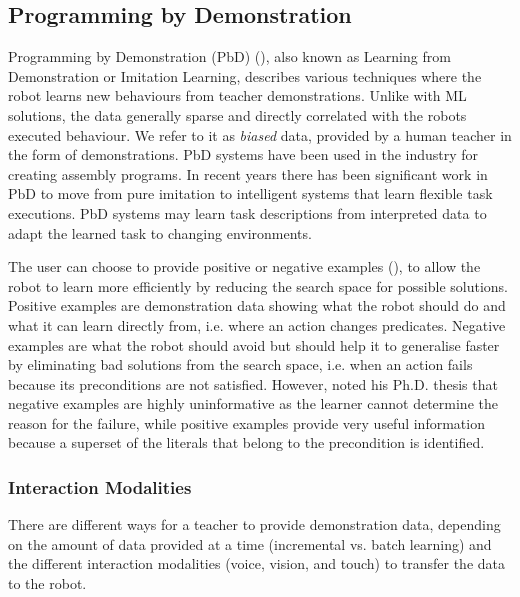 \subsection{Programming by Demonstration}\label{sssec:PbD}
Programming by Demonstration (PbD) (\cite{billard2016learning,argall2009survey}), also known as Learning from Demonstration or Imitation Learning, describes various techniques where the robot learns new behaviours from teacher demonstrations. 
Unlike with ML solutions, the data generally sparse and directly correlated with the robots executed behaviour.
We refer to it as \textit{biased} data, \eg provided by a human teacher in the form of demonstrations.
PbD systems have been used in the industry for creating assembly programs. 
In recent years there has been significant work in PbD to move from pure imitation to intelligent systems that learn flexible task executions. 
PbD systems may learn task descriptions from interpreted data to adapt the learned task to changing environments.

The user can choose to provide positive or negative examples (\cite{grollman2012robot}), to allow the robot to learn more efficiently by reducing the search space for possible solutions.
Positive examples are demonstration data showing what the robot should do and what it can learn directly from, i.e. where an action changes predicates.
Negative examples are what the robot should avoid but should help it to generalise faster by eliminating bad solutions from the search space, i.e. when an action fails because its preconditions are not satisfied.
However, \cite{walsh2010efficient} noted his Ph.D. thesis that negative examples are highly uninformative as the learner cannot determine the reason for the failure, while positive examples provide very useful information because a superset of the literals that belong to the precondition is identified.


\subsubsection{Interaction Modalities}
There are different ways for a teacher to provide demonstration data, depending on the amount of data provided at a time (incremental vs. batch learning) and the different interaction modalities (voice, vision, and touch) to transfer the data to the robot.


